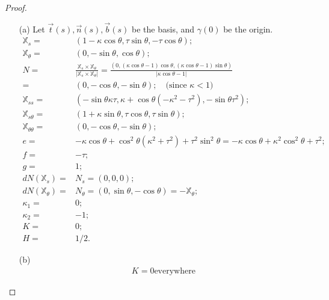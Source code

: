 \documentclass[10pt,a4paper]{article}
\begin{document}
\begin{proof}
\begin{enumerate}
\item[(a)] 
Let $\vec{t}(s), \vec{n}(s), \vec{b}(s)$ be the basis, and $\gamma(0)$ be the origin.
\begin{align*}
\mathbb{X}_{s} =& (1 - \kappa\cos\theta, \tau\sin\theta, -\tau\cos\theta); \\
\mathbb{X}_{\theta} =& (0, -\sin\theta, \cos\theta); \\
N =& \frac{\mathbb{X}_{s} \times \mathbb{X}_{\theta}}{|\mathbb{X}_{s} \times \mathbb{X}_{\theta}|} = \frac{(0, (\kappa\cos\theta - 1)\cos\theta, (\kappa\cos\theta - 1)\sin\theta)}{|\kappa\cos\theta - 1|} \\
  =& (0, -\cos\theta, -\sin\theta); \quad\text{(since $\kappa< 1$)} \\
\mathbb{X}_{ss} =& (-\sin\theta\kappa\tau, \kappa + \cos\theta(-\kappa^2 - \tau^2), -\sin\theta\tau^2); \\
\mathbb{X}_{s\theta} =& (1 + \kappa\sin\theta, \tau\cos\theta, \tau\sin\theta); \\
\mathbb{X}_{\theta\theta} =& (0, -\cos\theta, -\sin\theta); \\
e =& -\kappa\cos\theta + \cos^2\theta(\kappa^2 + \tau^2) + \tau^2\sin^2\theta = -\kappa\cos\theta + \kappa^2\cos^2\theta + \tau^2; \\
f =& -\tau; \\
g =& 1; \\
dN(\mathbb{X}_{s}) =& N_{s} = (0, 0, 0); \\
dN(\mathbb{X}_{\theta}) =& N_{\theta} = (0, \sin\theta, -\cos\theta) = -\mathbb{X}_{\theta}; \\
\kappa_1 =& 0; \\
\kappa_2 =& -1; \\
K =& 0; \\
H =& 1/2.
\end{align*}
\item[(b)] 
\begin{align*}
K = 0 \text{everywhere}
\end{align*}
\end{enumerate}
\end{proof}
\end{document}
